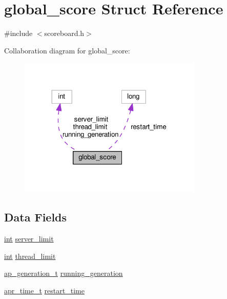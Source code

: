 \hypertarget{structglobal__score}{}\section{global\+\_\+score Struct Reference}
\label{structglobal__score}


{\ttfamily \#include $<$scoreboard.\+h$>$}



Collaboration diagram for global\+\_\+score\+:
\nopagebreak
\begin{figure}[H]
\begin{center}
\leavevmode
\includegraphics[width=248pt]{structglobal__score__coll__graph}
\end{center}
\end{figure}
\subsection*{Data Fields}
\begin{DoxyCompactItemize}
\item 
\hyperlink{pcre_8txt_a42dfa4ff673c82d8efe7144098fbc198}{int} \hyperlink{structglobal__score_ac28d7a957e390b94f4fd2bc6f2c6366c}{server\+\_\+limit}
\item 
\hyperlink{pcre_8txt_a42dfa4ff673c82d8efe7144098fbc198}{int} \hyperlink{structglobal__score_a76757ac2287bc3380260b86de6ab8ef4}{thread\+\_\+limit}
\item 
\hyperlink{scoreboard_8h_a36af569e52dd926cc530df071af3d939}{ap\+\_\+generation\+\_\+t} \hyperlink{structglobal__score_a2d68d2a23841cbc2d727acf3ff1ad5d2}{running\+\_\+generation}
\item 
\hyperlink{group__apr__time_gadb4bde16055748190eae190c55aa02bb}{apr\+\_\+time\+\_\+t} \hyperlink{structglobal__score_ace1aec17d7958881da29c9c2938bf238}{restart\+\_\+time}
\end{DoxyCompactItemize}



